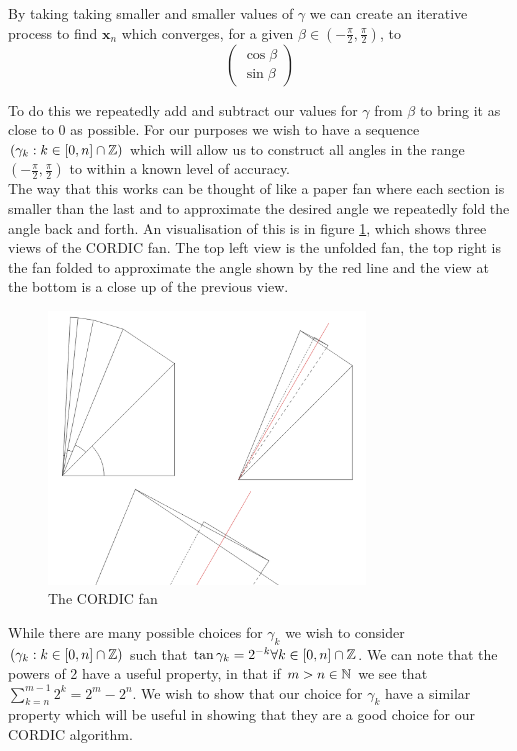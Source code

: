 {By taking taking smaller and smaller values of $\gamma$ we can create an iterative process to find $\mathbf{x}_n$ which converges, for a given $\beta \in (-\frac{\pi}{2}, \frac{\pi}{2})$, to
\begin{displaymath}
	\left( \begin{array}{c}
		\cos{\beta}\\
		\sin{\beta}
	\end{array} \right)
\end{displaymath}

To do this we repeatedly add and subtract our values for \(\gamma\) from \(\beta\) to bring it as close to 0 as possible. For our purposes we wish to have a sequence \((\gamma_k : k \in [0, n] \cap \mathbb{Z})\) which will allow us to construct all angles in the range \((-\frac{\pi}{2}, \frac{\pi}{2})\) to within a known level of accuracy. \\

The way that this works can be thought of like a paper fan where each section is smaller than the last and to approximate the desired angle we repeatedly fold the angle back and forth. An visualisation of this is in figure \ref{FIG_"Fan Diagram"}, which shows three views of the CORDIC fan. The top left view is the unfolded fan, the top right is the fan folded to approximate the angle shown by the red line and the view at the bottom is a close up of the previous view.

\begin{figure}[!ht]
	\label{FIG_"Fan Diagram"}
	\caption{The CORDIC fan}
	\centering
	\includegraphics[width=0.75\textwidth]{"./Diagrams/Fan Diagram"}
\end{figure}

While there are many possible choices for \(\gamma_k\) we wish to consider \((\gamma_k : k \in [0, n] \cap \mathbb{Z})\) such that \(\tan \gamma_k = 2^{-k} \forall k \in [0,n] \cap \mathbb{Z}\). We can note that the powers of 2 have a useful property, in that if \(m > n \in \mathbb{N}\) we see that \(\sum_{k=n}^{m-1} 2^k = 2^m - 2^n\). We wish to show that our choice for \(\gamma_k\) have a similar property which will be useful in showing that they are a good choice for our CORDIC algorithm.

}
